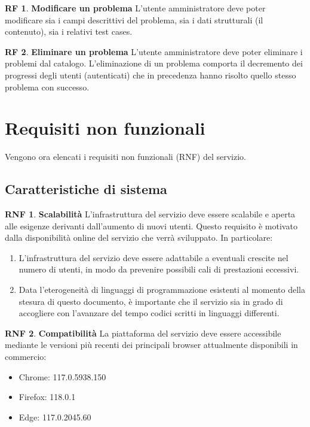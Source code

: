 \documentclass[11pt, a4paper]{article}
\theoremstyle{definition}
\newtheorem{funcreq}{RF} %
\newtheorem{nonfuncreq}{RNF} %
\begin{document}
\begin{funcreq}
\textbf{Modificare un problema }
L'utente amministratore deve poter modificare sia i campi descrittivi del
problema, sia i dati strutturali (il contenuto), sia i relativi test cases.
\end{funcreq}

\begin{funcreq}
\textbf{Eliminare un problema }
L'utente amministratore deve poter eliminare i problemi dal catalogo.
L'eliminazione di un problema comporta il decremento dei progressi degli
utenti (autenticati) che in precedenza hanno risolto quello stesso
problema con successo.
\end{funcreq}

\newpage
\section{Requisiti non funzionali}
Vengono ora elencati i requisiti non funzionali (RNF) del servizio.

\subsection{Caratteristiche di sistema}

\begin{nonfuncreq}
\label{scalabilita}
\textbf{Scalabilità }
L'infrastruttura del servizio deve essere scalabile e aperta alle esigenze
derivanti dall'aumento di nuovi utenti. Questo requisito è motivato dalla
disponibilità online del servizio che verrà sviluppato. In particolare:
\begin{enumerate}
    \item L'infrastruttura del servizio deve essere adattabile a eventuali
    crescite nel numero di utenti, in modo da prevenire possibili cali di
    prestazioni eccessivi.

    \item Data l'eterogeneità di linguaggi di programmazione esistenti
    al momento della stesura di questo documento, è importante che il
    servizio sia in grado di accogliere con l'avanzare del tempo codici
    scritti in linguaggi differenti.
\end{enumerate}
\end{nonfuncreq}

\begin{nonfuncreq}
\label{compatibility}
\textbf{Compatibilità }
La piattaforma del servizio deve essere accessibile mediante le versioni
più recenti dei principali browser attualmente disponibili in commercio:
\begin{itemize}
    \item Chrome: 117.0.5938.150
    \item Firefox: 118.0.1
    \item Edge: 117.0.2045.60
\end{itemize}
\end{nonfuncreq}
\end{document}
